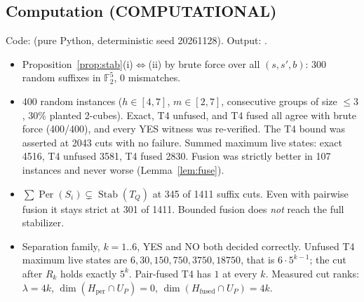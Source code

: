 \documentclass[11pt]{article}
\newcommand{\Per}{\operatorname{Per}}
\newcommand{\Stab}{\operatorname{Stab}}
\newcommand{\F}{\mathbb{F}_2}
\begin{document}
\subsection*{Computation (COMPUTATIONAL)}
Code:  (pure Python, deterministic seed 20261128). Output: .
\begin{itemize}
\item Proposition~\ref{prop:stab}(i)$\Leftrightarrow$(ii) by brute force over all $(s,s',b)$: 300 random suffixes in $\F^5$, 0 mismatches.
\item 400 random instances ($h\in[4,7]$, $m\in[2,7]$, consecutive groups of size $\le3$, 30\% planted 2-cubes). Exact, T4 unfused, and T4 fused all agree with
brute force (400/400), and every YES witness was re-verified. The T4 bound was asserted at 2043 cuts with no failure. Summed maximum live states: exact 4516, T4 unfused
3581, T4 fused 2830. Fusion was strictly better in 107 instances and never worse (Lemma~\ref{lem:fuse}).
\item $\sum\Per(S_i)\subsetneq\Stab(T_Q)$ at 345 of 1411 suffix cuts. Even with pairwise fusion it stays strict at 301 of 1411. Bounded fusion does \emph{not} reach the full
stabilizer.
\item Separation family, $k=1..6$, YES and NO both decided correctly. Unfused T4 maximum live states are $6,30,150,750,3750,18750$, that is $6\cdot5^{k-1}$; the cut after $R_k$ holds exactly $5^k$.
Pair-fused T4 has $1$ at every $k$. Measured cut ranks: $\lambda=4k$, $\dim(H_{\mathrm{per}}\cap U_P)=0$, $\dim(H_{\mathrm{fused}}\cap U_P)=4k$.
\end{itemize}
\end{document}
